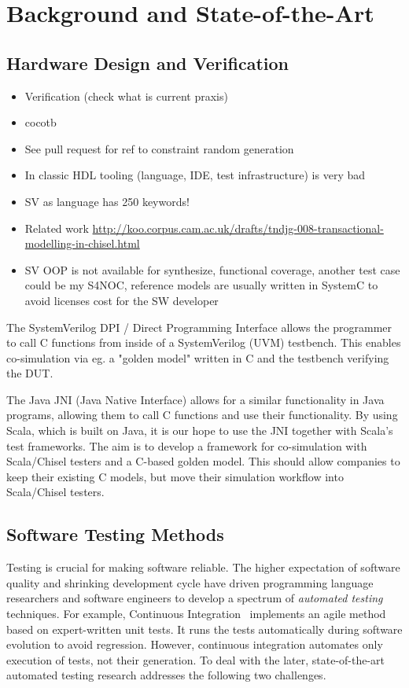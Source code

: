 \documentclass[fleqn,12pt]{article}
\begin{document}
\section{Background and State-of-the-Art}
\label{sec:background}


\subsection{Hardware Design and Verification}

\begin{itemize}
\item Verification (check what is current praxis)
\item cocotb
\item See pull request for ref to constraint random generation
\item In classic HDL tooling (language, IDE, test infrastructure) is very bad
\item SV as language has 250 keywords!
\item Related work \url{http://koo.corpus.cam.ac.uk/drafts/tndjg-008-transactional-modelling-in-chisel.html}
\item SV OOP is not available for synthesize, functional coverage, another test case could be my S4NOC, reference models are usually written in SystemC to avoid licenses cost for the SW developer
\end{itemize}

The SystemVerilog DPI / Direct Programming Interface allows the programmer to call
C functions from inside of a SystemVerilog (UVM) testbench.
This enables co-simulation via eg. a "golden model" written in C and the
testbench verifying the DUT.

The Java JNI (Java Native Interface) allows for a similar functionality in Java programs,
allowing them to call C functions and use their functionality.
By using Scala, which is built on Java, it is our hope to use the JNI together with Scala's test frameworks.
The aim is to develop a framework for co-simulation with Scala/Chisel testers and a
C-based golden model. This should allow companies to keep their existing C models,
but move their simulation workflow into Scala/Chisel testers.


\subsection{Software Testing Methods}
Testing is crucial for making software reliable. The higher
expectation of software quality and shrinking development cycle have
driven programming language researchers and software engineers to
develop a spectrum of \emph{automated testing} techniques. For example,
Continuous Integration~\cite{duvall2007continuous} implements an agile
method based on expert-written unit tests. It runs the tests
automatically during software evolution to avoid regression.  However, continuous integration automates only execution
of tests, not their generation. To deal with the later,
state-of-the-art automated testing research addresses
the following two challenges.
\end{document}
